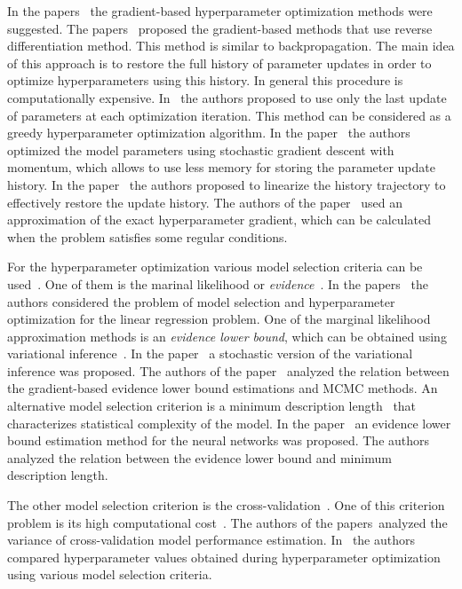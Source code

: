 \documentclass[smallcondensed]{svjour3}
\begin{document}
In the papers~\cite{hyper,hyper2,hyper_mad,hyper_hoag,hyper_greed} the gradient-based hyperparameter optimization methods were suggested. The papers~\cite{hyper_mad,hyper} proposed the gradient-based methods that use reverse differentiation method. This method is similar to backpropagation. The main idea of this approach is to restore the full history of parameter updates in order to optimize hyperparameters using this history. In general this procedure is computationally expensive. In~\cite{hyper_greed} the authors proposed to use only the last update of parameters at each optimization iteration. This method can be considered as a greedy hyperparameter optimization algorithm. In the paper~\cite{hyper} the authors optimized the model parameters using stochastic gradient descent with momentum, which allows to use less memory for storing the parameter update history. In the paper~\cite{hyper_mad} the authors proposed to linearize the history trajectory to effectively restore the update history. The authors of the paper~\cite{hyper_hoag} used an approximation of the exact hyperparameter gradient, which can be calculated when the problem satisfies some regular conditions.

For the hyperparameter optimization various model selection criteria can be used~\cite{MacKay,Bishop}. One of them is the marinal likelihood or \textit{evidence}~\cite{MacKay,Bishop,tokmakova,strijov_dsc}. In the papers~\cite{tokmakova,strijov_dsc} the authors considered the problem of model selection and hyperparameter optimization for the linear regression problem. One of the marginal likelihood approximation methods is an \textit{evidence lower bound}, which can be obtained using variational inference~\cite{Bishop}. In the paper~\cite{hoffman} a stochastic version of the variational inference was proposed. The authors of the paper~\cite{varmc} analyzed the relation between the gradient-based evidence lower bound estimations and MCMC methods. An alternative model selection criterion is a minimum description length~\cite{mdl} that characterizes statistical complexity of the model. In the paper~\cite{nips} an evidence lower bound estimation method for the neural networks was proposed. The authors analyzed the relation between the evidence lower bound and minimum description length. 

The other model selection criterion is the cross-validation~\cite{cv_ms,tokmakova}. One of this criterion problem  is its high computational cost~\cite{expensive,expensive2}. The authors of the papers~\cite{bias,bias2}analyzed the variance of cross-validation model performance estimation. In~\cite{tokmakova} the authors compared hyperparameter values obtained during hyperparameter optimization using various model selection criteria.
\end{document}
